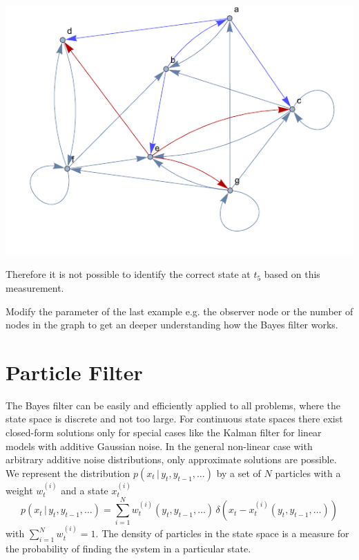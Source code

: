 \documentclass{tstextbook}
\begin{document}
\begin{example}
\includegraphics[scale=0.8, center]{images/highlighted_graph_world.pdf}

Therefore it is not possible to identify the correct state at $t_5$ based on this measurement.   

\end{example}

\begin{exercise}
Modify the parameter of the last example e.g. the observer node or the number of nodes in the graph to get an deeper understanding how the Bayes filter works.
\end{exercise}

\section{Particle Filter}
\label{se:particle_filter}

The Bayes filter can be easily and efficiently applied to all problems, where the state space is discrete and not too large. For continuous state spaces there exist closed-form solutions only for special cases like the Kalman filter for linear models with additive Gaussian noise. In the general non-linear case with arbitrary additive noise distributions, only approximate solutions are possible.\\

We represent the distribution $p(x_{t}\,\vert\, y_{t},y_{t-1},\ldots)$ by a set of $N$ particles with a weight $w^{(i)}_t$ and a state $x^{(i)}_t$ 
\begin{equation}
p(x_{t}\,\vert\, y_{t},y_{t-1},\ldots)=\sum_{i=1}^N w^{(i)}_t(y_{t},y_{t-1},\ldots) \,\delta\left(x_t - x^{(i)}_t(y_{t},y_{t-1},\ldots)\right)
\end{equation}
with $\sum_{i=1}^N w^{(i)}_t=1$. The density of particles in the state space is a measure for the probability of finding the system in a particular state.
\end{document}
